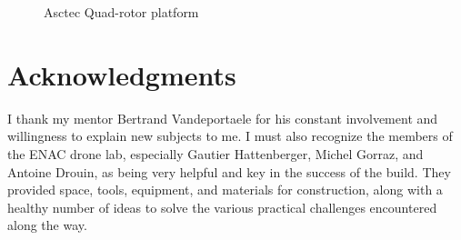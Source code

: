 \documentclass[a4paper,11pt]{report}
\begin{document}
\begin{figure}[ht]
  \centering
  \caption{Asctec Quad-rotor platform}
  \label{fig:quad}
\end{figure} 

\section{Acknowledgments}

I thank my mentor Bertrand Vandeportaele for his constant involvement and willingness to explain new subjects to me. I must also recognize the members of the ENAC drone lab, especially Gautier Hattenberger, Michel Gorraz, and Antoine Drouin, as being very helpful and key in the success of the build. They provided space, tools, equipment, and materials for construction, along with a healthy number of ideas to solve the various practical challenges encountered along the way.
\end{document}
